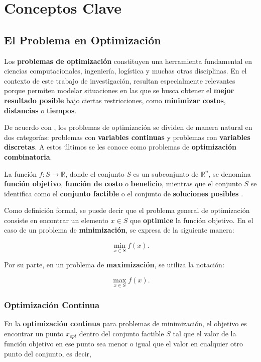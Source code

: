 \documentclass[12pt,titlepage,twoside,openright]{book}
\begin{document}
\section{Conceptos Clave}

\subsection{El Problema en Optimización}

Los \textbf{problemas de optimización} constituyen una herramienta fundamental en ciencias computacionales, ingeniería, logística y muchas otras disciplinas. En el contexto de este trabajo de investigación, resultan especialmente relevantes porque permiten modelar situaciones en las que se busca obtener el \textbf{mejor resultado posible} bajo ciertas restricciones, como \textbf{minimizar costos}, \textbf{distancias} o \textbf{tiempos}.

De acuerdo con \citep{cobos2010}, los problemas de optimización se dividen de manera natural en dos categorías: problemas con \textbf{variables continuas} y problemas con \textbf{variables discretas}. A estos últimos se les conoce como problemas de \textbf{optimización combinatoria}.

La función \(f : S \to \mathbb{R}\), donde el conjunto \(S\) es un subconjunto de \(\mathbb{R}^n\), se denomina \textbf{función objetivo}, \textbf{función de costo} o \textbf{beneficio}, mientras que el conjunto \(S\) se identifica como el \textbf{conjunto factible} o el conjunto de \textbf{soluciones posibles} \citep{cobos2010}.

Como definición formal, se puede decir que el problema general de optimización consiste en encontrar un elemento \(x \in S\) que \textbf{optimice} la función objetivo. En el caso de un problema de \textbf{minimización}, se expresa de la siguiente manera:

\[
	\min_{x \in S} f(x).
\]

Por su parte, en un problema de \textbf{maximización}, se utiliza la notación:

\[
	\max_{x \in S} f(x).
\]

\citep{cobos2010}



\subsubsection{Optimización Continua}

En la \textbf{optimización continua} para problemas de minimización, el objetivo es encontrar un punto \( x_{opt} \) dentro del conjunto factible \( S \) tal que el valor de la función objetivo en ese punto sea menor o igual que el valor en cualquier otro punto del conjunto, es decir,
\end{document}
